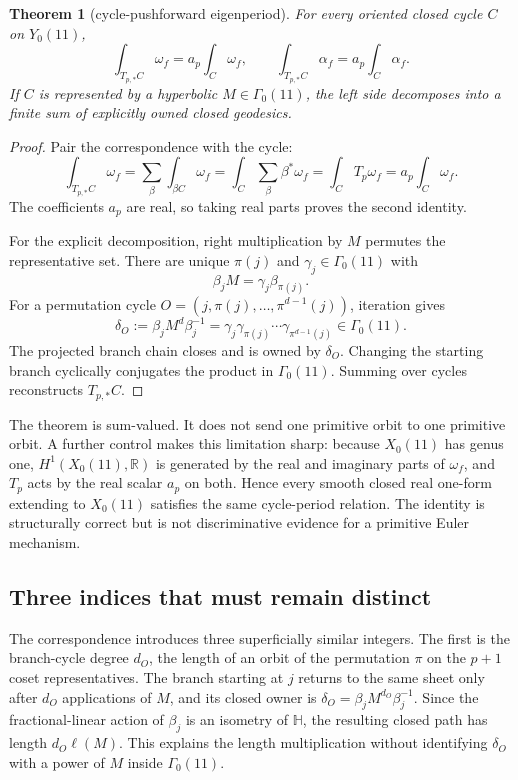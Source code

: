 \documentclass[11pt]{article}
\newtheorem{theorem}{Theorem}[section]
\theoremstyle{definition}
\theoremstyle{remark}
\newcommand{\G}{\Gamma_0(11)}
\newcommand{\HH}{\mathbb H}
\newcommand{\RR}{\mathbb R}
\begin{document}
\begin{theorem}[cycle-pushforward eigenperiod]\label{thm:hecke}
For every oriented closed cycle $C$ on $Y_0(11)$,
\[
\int_{T_{p,*}C}\omega_f=a_p\int_C\omega_f,
\qquad
\int_{T_{p,*}C}\alpha_f=a_p\int_C\alpha_f.
\]
If $C$ is represented by a hyperbolic $M\in\G$, the left side decomposes into a finite sum of explicitly owned closed geodesics.
\end{theorem}

\begin{proof}
Pair the correspondence with the cycle:
\[
\int_{T_{p,*}C}\omega_f
=\sum_\beta\int_{\beta C}\omega_f
=\int_C\sum_\beta\beta^*\omega_f
=\int_CT_p\omega_f
=a_p\int_C\omega_f.
\]
The coefficients $a_p$ are real, so taking real parts proves the second identity.

For the explicit decomposition, right multiplication by $M$ permutes the representative set. There are unique $\pi(j)$ and $\gamma_j\in\G$ with
\[
\beta_jM=\gamma_j\beta_{\pi(j)}.
\]
For a permutation cycle $O=(j,\pi(j),\ldots,\pi^{d-1}(j))$, iteration gives
\[
\delta_O:=\beta_jM^d\beta_j^{-1}
=\gamma_j\gamma_{\pi(j)}\cdots\gamma_{\pi^{d-1}(j)}\in\G.
\]
The projected branch chain closes and is owned by $\delta_O$. Changing the starting branch cyclically conjugates the product in $\G$. Summing over cycles reconstructs $T_{p,*}C$.
\end{proof}

The theorem is sum-valued. It does not send one primitive orbit to one primitive orbit. A further control makes this limitation sharp: because $X_0(11)$ has genus one, $H^1(X_0(11),\RR)$ is generated by the real and imaginary parts of $\omega_f$, and $T_p$ acts by the real scalar $a_p$ on both. Hence every smooth closed real one-form extending to $X_0(11)$ satisfies the same cycle-period relation. The identity is structurally correct but is not discriminative evidence for a primitive Euler mechanism.

\subsection{Three indices that must remain distinct}

The correspondence introduces three superficially similar integers. The first is the branch-cycle degree $d_O$, the length of an orbit of the permutation $\pi$ on the $p+1$ coset representatives. The branch starting at $j$ returns to the same sheet only after $d_O$ applications of $M$, and its closed owner is $\delta_O=\beta_jM^{d_O}\beta_j^{-1}$. Since the fractional-linear action of $\beta_j$ is an isometry of $\HH$, the resulting closed path has length $d_O\ell(M)$. This explains the length multiplication without identifying $\delta_O$ with a power of $M$ inside $\G$.
\end{document}
